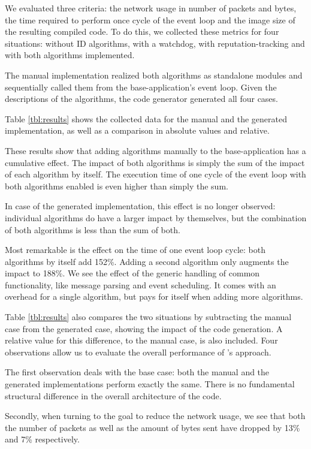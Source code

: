 \documentclass[conference]{IEEEtran}
\begin{document}
We evaluated three criteria: the network usage in number of packets and bytes,
the time required to perform once cycle of the event loop and the image size of
the resulting compiled code. To do this, we collected these metrics for four
situations: without ID algorithms, with a watchdog, with reputation-tracking
and with both algorithms implemented.

The manual implementation realized both algorithms as standalone modules and
sequentially called them from the base-application's event loop. Given the
\NAME descriptions of the algorithms, the code generator generated all four
cases.

Table \ref{tbl:results} shows the collected data for the manual and the
generated implementation, as well as a comparison in absolute values and
relative.

These results show that adding algorithms manually to the base-application has
a cumulative effect. The impact of both algorithms is simply the sum of the
impact of each algorithm by itself. The execution time of one cycle of the
event loop with both algorithms enabled is even higher than simply the sum.

In case of the generated implementation, this effect is no longer observed:
individual algorithms do have a larger impact by themselves, but the
combination of both algorithms is less than the sum of both.

Most remarkable is the effect on the time of one event loop cycle: both
algorithms by itself add 152\%. Adding a second algorithm only augments the
impact to 188\%. We see the effect of the generic handling of common
functionality, like message parsing and event scheduling. It comes with an
overhead for a single algorithm, but pays for itself when adding more
algorithms.

Table \ref{tbl:results} also compares the two situations by subtracting the
manual case from the generated case, showing the impact of the code generation.
A relative value for this difference, to the manual case, is also included.
Four observations allow us to evaluate the overall performance of \NAME's
approach.

The first observation deals with the base case: both the manual and the
generated implementations perform exactly the same. There is no fundamental
structural difference in the overall architecture of the code.

Secondly, when turning to the goal to reduce the network usage, we see that both
the number of packets as well as the amount of bytes sent have dropped by 13\%
and 7\% respectively.
\end{document}
